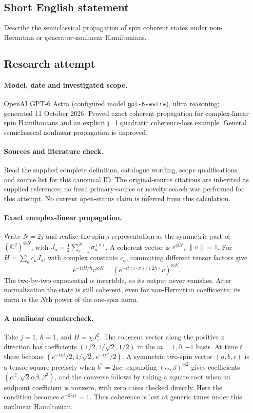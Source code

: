 \documentclass[11pt]{article}
\begin{document}
\subsection{Short English statement}
Describe the semiclassical propagation of spin coherent states under non-Hermitian or generator-nonlinear Hamiltonians.
\subsection{Research attempt}
\paragraph{Model, date and investigated scope.}
OpenAI GPT-6 Astra (configured model \texttt{gpt-6-astra}), ultra reasoning; generated 11 October 2026. Proved exact coherent propagation for complex-linear spin Hamiltonians and an explicit j=1 quadratic coherence-loss example. General semiclassical nonlinear propagation is unproved.

\paragraph{Sources and literature check.}
Read the supplied complete definition, catalogue wording, scope qualifications and source list for this canonical ID. The original-source citations are inherited as supplied references; no fresh primary-source or novelty search was performed for this attempt. No current open-status claim is inferred from this calculation.

\paragraph{Exact complex-linear propagation.}Write \(N=2j\) and realize the spin-\(j\) representation as the symmetric part of \((\mathbb C^2)^{\otimes N}\), with \(J_a=\tfrac12\sum_{r=1}^N\sigma_a^{(r)}\). A coherent vector is \(v^{\otimes N}\), \(\|v\|=1\). For \(H=\sum_ac_aJ_a\), with complex constants \(c_a\), commuting different tensor factors give
\[e^{-itH/\hbar}v^{\otimes N}=\left(e^{-it(c\cdot\sigma)/(2\hbar)}v\right)^{\otimes N}.
\]
The two-by-two exponential is invertible, so its output never vanishes. After normalization the state is still coherent, even for non-Hermitian coefficients; its norm is the \(N\)th power of the one-spin norm.
\paragraph{A nonlinear countercheck.}Take \(j=1\), \(\hbar=1\), and \(H=\chi J_z^2\). The coherent vector along the positive x direction has coefficients \((1/2,1/\sqrt2,1/2)\) in the \(m=1,0,-1\) basis. At time \(t\) these become \((e^{-i\chi t}/2,1/\sqrt2,e^{-i\chi t}/2)\). A symmetric two-spin vector \((a,b,c)\) is a tensor square precisely when \(b^2=2ac\): expanding \((\alpha,\beta)^{\otimes2}\) gives coefficients \((\alpha^2,\sqrt2\alpha\beta,\beta^2)\), and the converse follows by taking a square root when an endpoint coefficient is nonzero, with zero cases checked directly. Here the condition becomes \(e^{-2i\chi t}=1\). Thus coherence is lost at generic times under this nonlinear Hamiltonian.
\end{document}
